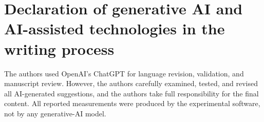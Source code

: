 \documentclass[a4paper,fleqn]{cas-dc}
\begin{document}
\section*{Declaration of generative AI and AI-assisted technologies in the writing process}

The authors used OpenAI's ChatGPT for language revision, validation, and manuscript review. However, the authors carefully examined, tested, and revised all AI-generated suggestions, and the authors take full responsibility for the final content. All reported measurements were produced by the experimental software, not by any generative-AI model.



\end{document}
